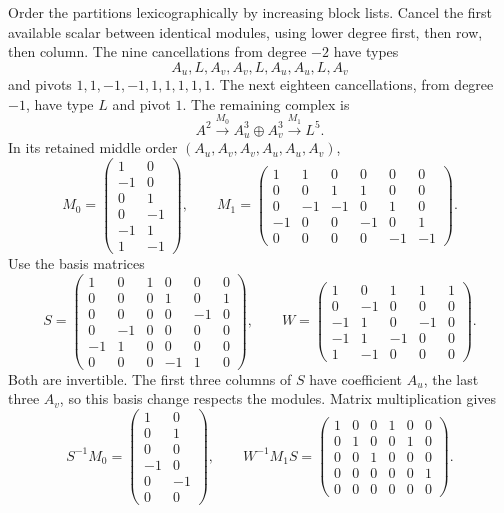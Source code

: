 Order the partitions lexicographically by increasing block
lists. Cancel the first available scalar between identical
modules, using lower degree first, then row, then column.
The nine cancellations from degree $-2$ have types
\[
 A_u,L,A_v,A_v,L,A_u,A_u,L,A_v
\]
and pivots $1,1,-1,-1,1,1,1,1,1$.
The next eighteen cancellations, from degree $-1$, have type
$L$ and pivot $1$. The remaining complex is
\[
 A^2\xrightarrow{M_0}A_u^3\oplus A_v^3
                              \xrightarrow{M_1}L^5.
\]
In its retained middle order $(A_u,A_v,A_v,A_u,A_u,A_v)$,
\[
 M_0=\begin{pmatrix}1&0\\-1&0\\0&1\\0&-1\\-1&1\\1&-1\end{pmatrix},
 \qquad
 M_1=\begin{pmatrix}
 1&1&0&0&0&0\\0&0&1&1&0&0\\0&-1&-1&0&1&0\\
 -1&0&0&-1&0&1\\0&0&0&0&-1&-1
 \end{pmatrix}.
\]
Use the basis matrices
\[
 S=\begin{pmatrix}
 1&0&1&0&0&0\\0&0&0&1&0&1\\0&0&0&0&-1&0\\
 0&-1&0&0&0&0\\-1&1&0&0&0&0\\0&0&0&-1&1&0
 \end{pmatrix},\qquad
 W=\begin{pmatrix}
 1&0&1&1&1\\0&-1&0&0&0\\-1&1&0&-1&0\\
 -1&1&-1&0&0\\1&-1&0&0&0
 \end{pmatrix}.
\]
Both are invertible. The first three columns of $S$ have
coefficient $A_u$, the last three $A_v$, so this basis change
respects the modules. Matrix multiplication gives
\begin{equation}\label{eq:vol2-crossed-canonical}
 S^{-1}M_0=
 \begin{pmatrix}1&0\\0&1\\0&0\\-1&0\\0&-1\\0&0\end{pmatrix},
 \qquad
 W^{-1}M_1S=
 \begin{pmatrix}
 1&0&0&1&0&0\\0&1&0&0&1&0\\0&0&1&0&0&0\\
 0&0&0&0&0&1\\0&0&0&0&0&0
 \end{pmatrix}.
\end{equation}

